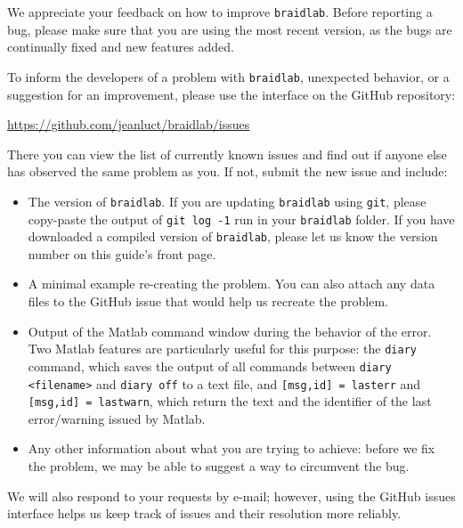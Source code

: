 \documentclass[12pt]{article}
\newcommand{\braidlab}{\texttt{braidlab}}%
\begin{document}
We appreciate your feedback on how to improve \braidlab. Before reporting a
bug, please make sure that you are using the most recent version, as the bugs
are continually fixed and new features added.

To inform the developers of a problem with \braidlab, unexpected behavior, or
a suggestion for an improvement, please use the interface on the GitHub
repository:
\begin{center}\url{https://github.com/jeanluct/braidlab/issues} \end{center}

There you can view the list of currently known issues and find out if anyone
else has observed the same problem as you. If not, submit the new issue and
include:
\begin{itemize}
\item The version of \braidlab. If you are updating \braidlab{} using
  \lstinline{git}, please copy-paste the output of \lstinline{git log -1} run
  in your \braidlab{} folder. If you have downloaded a compiled version of
  \braidlab{}, please let us know the version number on this guide's front
  page.
\item A minimal example re-creating the problem. You can also attach any data
  files to the GitHub issue that would help us recreate the problem.
\item Output of the Matlab command window during the behavior of the
  error. Two Matlab features are particularly useful for this purpose: the
  \lstinline{diary} command, which saves the output of all commands between
  \lstinline{diary <filename>} and \lstinline{diary off} to a text file, and
  \lstinline{[msg,id] = lasterr} and \lstinline{[msg,id] = lastwarn}, which
  return the text and the identifier of the last error/warning issued by
  Matlab.
\item Any other information about what you are trying to achieve: before we
  fix the problem, we may be able to suggest a way to circumvent the bug.
\end{itemize}

We will also respond to your requests by e-mail; however, using the GitHub
issues interface helps us keep track of issues and their resolution more
reliably.  



{\small

}

% 

%
%
%


\clearpage
{}
\printindex
\end{document}
